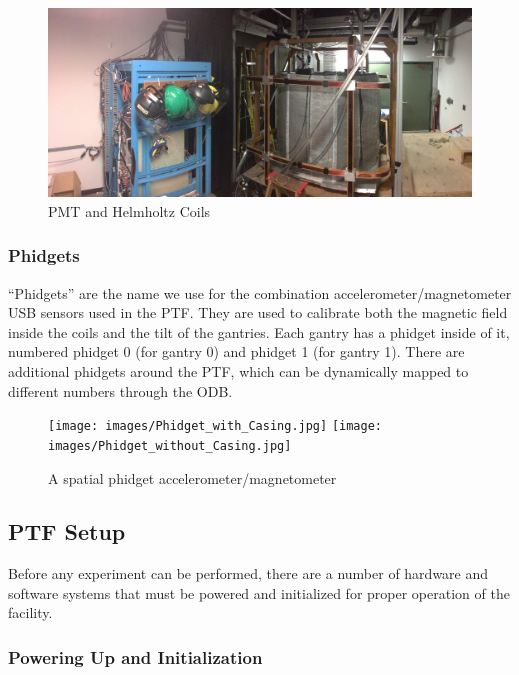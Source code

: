 \documentclass[twoside,letterpaper]{refart}
\begin{document}
\begin{figure}[!htpb]\centering	
	\includegraphics[width=\textwidth]{images/panoPTF}
	\caption{PMT and Helmholtz Coils\label{fig:pmtAndCoils}}
\end{figure}

\FloatBarrier

\clearpage

\subsubsection{Phidgets}

``Phidgets'' are the name we use for the combination accelerometer/magnetometer USB sensors used in the PTF. They are used to calibrate both the magnetic field inside the coils and the tilt of the gantries. Each gantry has a phidget inside of it, numbered phidget 0 (for gantry 0) and phidget 1 (for gantry 1). There are additional phidgets around the PTF, which can be dynamically mapped to different numbers through the ODB.


\begin{figure}[!htpb]\centering
	\texttt{[image: images/Phidget\_with\_Casing.jpg]}
	\texttt{[image: images/Phidget\_without\_Casing.jpg]}
	\caption{A spatial phidget accelerometer/magnetometer\label{fig:phidget}}
\end{figure}


\clearpage


\subsection{PTF Setup}

Before any experiment can be performed, there are a number of hardware and software systems that must be powered and initialized for proper operation of the facility.

\subsubsection{Powering Up and Initialization}
\end{document}
